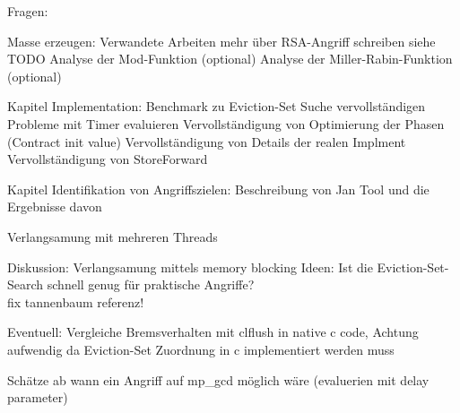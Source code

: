

Fragen:

Masse erzeugen:
Verwandete Arbeiten mehr über RSA-Angriff schreiben siehe TODO
Analyse der Mod-Funktion (optional)
Analyse der Miller-Rabin-Funktion (optional)

Kapitel Implementation:
Benchmark zu Eviction-Set Suche vervollständigen
Probleme mit Timer evaluieren
Vervollständigung von Optimierung der Phasen (Contract init value)
Vervollständigung von Details der realen Implment
Vervollständigung von StoreForward

Kapitel Identifikation von Angriffszielen:
Beschreibung von Jan Tool und die Ergebnisse davon


Verlangsamung mit mehreren Threads

Diskussion:
Verlangsamung mittels memory blocking
Ideen: 
Ist die Eviction-Set-Search schnell genug für praktische Angriffe?\\

fix tannenbaum referenz!

Eventuell: Vergleiche Bremsverhalten mit clflush in native c code,
Achtung aufwendig da Eviction-Set Zuordnung in c implementiert werden muss

Schätze ab wann ein Angriff auf mp_gcd möglich wäre (evaluerien mit delay parameter)\\






